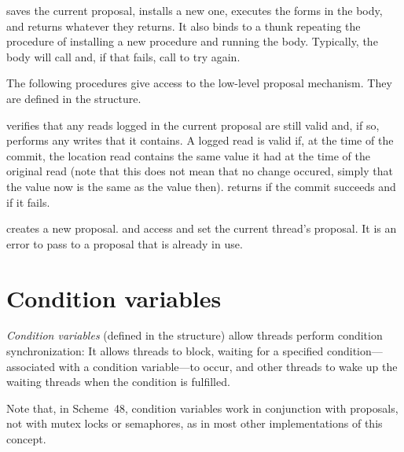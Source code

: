  saves the current proposal, installs a new
one, executes the forms in the body, and returns whatever they
returns.  It also binds  to a thunk repeating the
procedure of installing a new procedure and running the body.
Typically, the body will call  and, if that fails,
call  to try again.

The following procedures give access to the low-level proposal
mechanism.  They are defined in the  structure.
\begin{protos}
\end{protos}
\noindent
{} verifies that any reads logged in the current proposal are
 still valid and, if so, performs any writes that it contains.
A logged read is valid if, at the time of the commit, the location read contains
 the same value it had at the time of the original read (note that this does
 not mean that no change occured, simply that the value now is the same as
 the value then).
 returns  if the commit succeeds and 
 if it fails.

 creates a new proposal.
 and  access and set
 the current thread's proposal.
It is an error to pass to  a proposal that
 is already in use.


\section{Condition variables}

\textit{Condition variables} (defined in the 
structure) allow threads perform condition synchronization: It allows
threads to block, waiting for a specified condition---associated with a
condition variable---to occur, and other threads to wake up the waiting
threads when the condition is fulfilled.

Note that, in Scheme~48, condition variables work in conjunction with
proposals, not with mutex locks or semaphores, as in most other
implementations of this concept.

